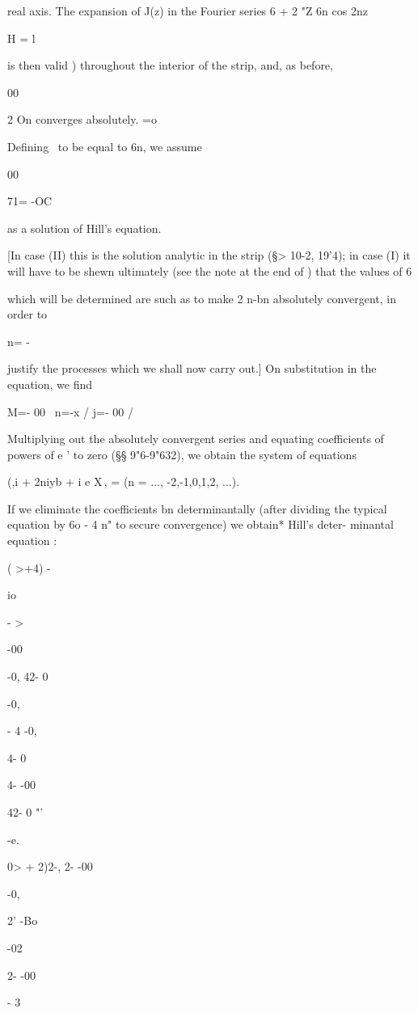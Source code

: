 real axis. The expansion of J(z) in the Fourier series 6 + 2 "Z 6n cos
2nz

H = l

is then valid ) throughout the interior of the strip, and, as
before,

00

2 On converges absolutely. =o

Defining \ to be equal to 6n, we assume

00

71= -OC

as a solution of Hill's equation.

[In case (II) this is the solution analytic in the strip (§> 10-2,
19'4); in case (I) it will have to be shewn ultimately (see the note
at the end of ) that the values of 6

which will be determined are such as to make 2 n-bn absolutely
convergent, in order to

n= -

justify the processes which we shall now carry out.] On substitution
in the equation, we find

M=- 00 \ n=-x / j=- 00 /

Multiplying out the absolutely convergent series and equating
coefficients of powers of e ' to zero (§§ 9"6-9"632), we obtain the
system of equations

(,i + 2niyb + i e X\,, = (n = ..., -2,-1,0,1,2, ...).

%
%

If we eliminate the coefficients bn determinantally (after dividing
the typical equation by 6o - 4 n" to secure convergence) we obtain*
Hill's deter- minantal equation :

( >+4) -

io

- >

-00

-0, 42- 0

-0,

- 4 -0,

4- 0

4- -00

42- 0 "'

-e.

0> + 2)2-, 2- -00

-0,

 2' -Bo

-02

2- -00

- 3

